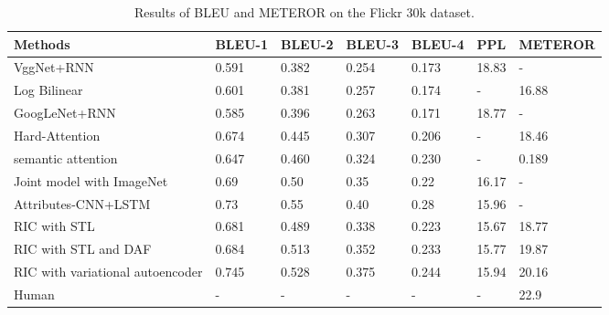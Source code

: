 \documentclass[10pt,twocolumn,letterpaper]{article}
\begin{document}
	\begin{table*}[]
		\centering
		\caption{Results of  BLEU \cite{papineni2002bleu} and METEROR \cite{banerjee2005meteor} on the Flickr 30k \cite{yang2011corpus}  dataset. }
		\label{30k}
		\begin{tabular}{@{}lllllll@{}}
			\toprule
			Methods         &  BLEU-1   & BLEU-2   & BLEU-3  & BLEU-4 & PPL & METEROR\\ \midrule
			VggNet+RNN            & 0.591 & 0.382 & 0.254 & 0.173 & 18.83 & - \\
			Log Bilinear\cite{kiros2014multimodal}     & 0.601 & 0.381 & 0.257 & 0.174 & - & 16.88 \\
			GoogLeNet+RNN           & 0.585 & 0.396 & 0.263 & 0.171 & 18.77 & - \\
			Hard-Attention \cite{xu2015show}         &  0.674 & 0.445 & 0.307 & 0.206 & - &18.46    \\
			semantic attention \cite{you2016image} &0.647& 0.460 &0.324 &0.230 &- &0.189 \\
			Joint model with ImageNet \cite{pu2016variational}           & 0.69 & 0.50 & 0.35 & 0.22& 16.17 & - \\
			Attributes-CNN+LSTM \cite{wu2015value} & 0.73 & 0.55 & 0.40& 0.28 & 15.96 & -  \\
			RIC with STL  & 0.681 & 0.489 & 0.338 & 0.223 & 15.67 & 18.77 \\
			RIC with STL and DAF & 0.684 & 0.513 & 0.352 & 0.233 & 15.77 & 19.87 \\
			RIC with variational autoencoder   & 0.745 & 0.528 & 0.375 & 0.244 & 15.94 & 20.16 \\
			Human\cite{chen2014learning}   & - & - & - & -& -& 22.9 \\ \bottomrule
		\end{tabular}
	\end{table*}
	
	
	
	
	
\end{document}
